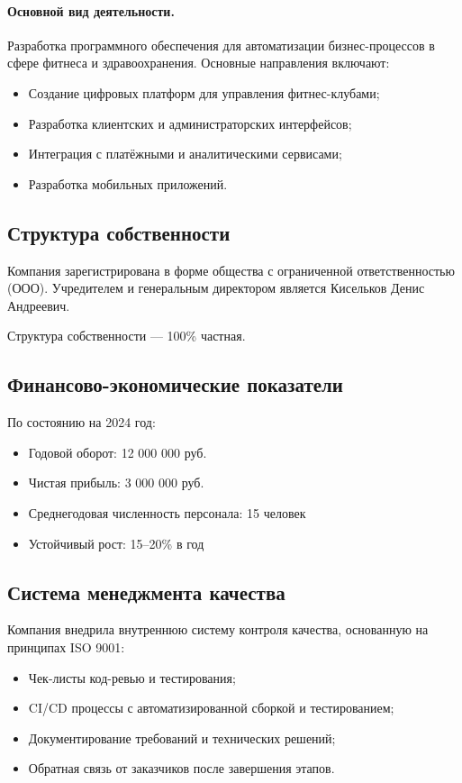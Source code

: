 \documentclass[14pt, russian]{matmex-diploma-custom}
\begin{document}
\paragraph{Основной вид деятельности.}
Разработка программного обеспечения для автоматизации бизнес-процессов в сфере фитнеса и здравоохранения.
Основные направления включают:
\begin{itemize}[noitemsep]
  \item Создание цифровых платформ для управления фитнес-клубами;
  \item Разработка клиентских и администраторских интерфейсов;
  \item Интеграция с платёжными и аналитическими сервисами;
  \item Разработка мобильных приложений.
\end{itemize}

\subsection{Структура собственности}

Компания зарегистрирована в форме общества с ограниченной ответственностью (ООО). Учредителем и генеральным директором является Кисельков Денис Андреевич.

Структура собственности — 100\% частная.

\subsection{Финансово-экономические показатели}

По состоянию на 2024 год:

\begin{itemize}[noitemsep]
  \item Годовой оборот: 12 000 000 руб.
  \item Чистая прибыль: 3 000 000 руб.
  \item Среднегодовая численность персонала: 15 человек
  \item Устойчивый рост: 15–20\% в год
\end{itemize}

\subsection{Система менеджмента качества}

Компания внедрила внутреннюю систему контроля качества, основанную на принципах ISO 9001:
\begin{itemize}[noitemsep]
  \item Чек-листы код-ревью и тестирования;
  \item CI/CD процессы с автоматизированной сборкой и тестированием;
  \item Документирование требований и технических решений;
  \item Обратная связь от заказчиков после завершения этапов.
\end{itemize}
\end{document}
